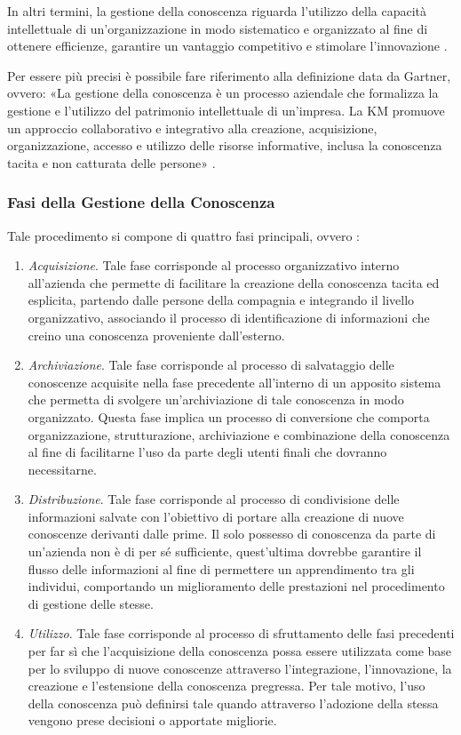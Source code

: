 In altri termini, la gestione della conoscenza riguarda l'utilizzo della capacità intellettuale di un'organizzazione in modo sistematico e organizzato al fine di ottenere efficienze, garantire un vantaggio competitivo e stimolare l'innovazione \cite{ieee_enterprise_knowledge_management}.

Per essere più precisi è possibile fare riferimento alla definizione data da Gartner, ovvero: «La gestione della conoscenza è un processo aziendale che formalizza la gestione e l'utilizzo del patrimonio intellettuale di un'impresa. La KM promuove un approccio collaborativo e integrativo alla creazione, acquisizione, organizzazione, accesso e utilizzo delle risorse informative, inclusa la conoscenza tacita e non catturata delle persone» \cite{gartner_knowledge_management}.

\subsubsection{Fasi della Gestione della Conoscenza}

Tale procedimento si compone di quattro fasi principali, ovvero \cite{knowledge_management_process}:
\begin{enumerate}
    \item \textit{Acquisizione}. Tale fase corrisponde al processo organizzativo interno all'azienda che permette di facilitare la creazione della conoscenza tacita ed esplicita, partendo dalle persone della compagnia e integrando il livello organizzativo, associando il processo di identificazione di informazioni che creino una conoscenza proveniente dall'esterno.
    \item \textit{Archiviazione}. Tale fase corrisponde al processo di salvataggio delle conoscenze acquisite nella fase precedente all'interno di un apposito sistema che permetta di svolgere un'archiviazione di tale conoscenza in modo organizzato. Questa fase implica un processo di conversione che comporta organizzazione, strutturazione, archiviazione e combinazione della conoscenza al fine di facilitarne l'uso da parte degli utenti finali che dovranno necessitarne.
    \item \textit{Distribuzione}. Tale fase corrisponde al processo di condivisione delle informazioni salvate con l'obiettivo di portare alla creazione di nuove conoscenze derivanti dalle prime. Il solo possesso di conoscenza da parte di un'azienda non è di per sé sufficiente, quest'ultima dovrebbe garantire il flusso delle informazioni al fine di permettere un apprendimento tra gli individui, comportando un miglioramento delle prestazioni nel procedimento di gestione delle stesse.
    \item \textit{Utilizzo}. Tale fase corrisponde al processo di sfruttamento delle fasi precedenti per far sì che l'acquisizione della conoscenza possa essere utilizzata come base per lo sviluppo di nuove conoscenze attraverso l'integrazione, l'innovazione, la creazione e l'estensione della conoscenza pregressa. Per tale motivo, l'uso della conoscenza può definirsi tale quando attraverso l'adozione della stessa vengono prese decisioni o apportate migliorie.
\end{enumerate}

